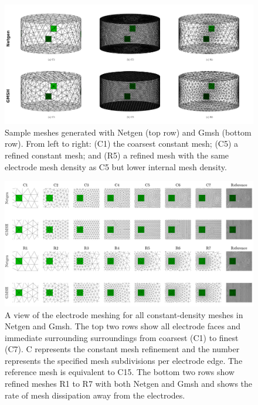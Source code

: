 \begin{figure}
   \includegraphics[width=\columnwidth]{chapter4-mesh_refinement/imgs/sample_meshes.pdf}
   \caption[Example meshes for various refinement strategies]{\label{fig:sample_meshes} 
   Sample meshes generated with Netgen (top row)
   and Gmsh (bottom row). From left to right: (C1) the coarsest constant
   mesh; (C5) a refined constant mesh; and (R5) a refined mesh with the same
   electrode mesh density as C5 but lower internal mesh density.}
\end{figure}

\begin{figure}
  \includegraphics[width=\textwidth]{chapter4-mesh_refinement/imgs/electrode_mesh_size_large.pdf}
  \caption[Mesh size surrounding the electrode]{\label{fig:electrode_mesh_size} A view of the electrode meshing for all constant-density meshes 
  in Netgen and Gmsh. The top two rows show all electrode faces and immediate surrounding
  surroundings from coarsest (C1) to finest (C7). C represents the constant mesh refinement and the number
  represents the specified mesh subdivisions per electrode edge. The reference mesh is equivalent to C15.
  The bottom two rows show refined meshes R1 to R7 with both Netgen and Gmsh and shows the rate of mesh
  dissipation away from the electrodes.}
\end{figure}

